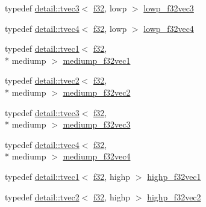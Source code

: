 \begin{DoxyCompactItemize}
\item 
typedef \hyperlink{structglm_1_1detail_1_1tvec3}{detail\-::tvec3}$<$ \hyperlink{group__gtc__type__precision_ga0ec999b57f5330d9021256e96038df04}{f32}, lowp $>$ \hyperlink{group__gtc__type__precision_ga1f878d91a5f5ab92c756244b62af7248}{lowp\-\_\-f32vec3}
\item 
typedef \hyperlink{structglm_1_1detail_1_1tvec4}{detail\-::tvec4}$<$ \hyperlink{group__gtc__type__precision_ga0ec999b57f5330d9021256e96038df04}{f32}, lowp $>$ \hyperlink{group__gtc__type__precision_ga59f7292d7ed0b7df72e6aa31010e2648}{lowp\-\_\-f32vec4}
\item 
typedef \hyperlink{structglm_1_1detail_1_1tvec1}{detail\-::tvec1}$<$ \hyperlink{group__gtc__type__precision_ga0ec999b57f5330d9021256e96038df04}{f32}, \\*
mediump $>$ \hyperlink{group__gtc__type__precision_gaf3d4077b241fbcab529fb0e0d88c0df6}{mediump\-\_\-f32vec1}
\item 
typedef \hyperlink{structglm_1_1detail_1_1tvec2}{detail\-::tvec2}$<$ \hyperlink{group__gtc__type__precision_ga0ec999b57f5330d9021256e96038df04}{f32}, \\*
mediump $>$ \hyperlink{group__gtc__type__precision_gaf53d380f948fdbb540eab960f2ad4b58}{mediump\-\_\-f32vec2}
\item 
typedef \hyperlink{structglm_1_1detail_1_1tvec3}{detail\-::tvec3}$<$ \hyperlink{group__gtc__type__precision_ga0ec999b57f5330d9021256e96038df04}{f32}, \\*
mediump $>$ \hyperlink{group__gtc__type__precision_gada8879dd10f28428e2eb1ae62f643f65}{mediump\-\_\-f32vec3}
\item 
typedef \hyperlink{structglm_1_1detail_1_1tvec4}{detail\-::tvec4}$<$ \hyperlink{group__gtc__type__precision_ga0ec999b57f5330d9021256e96038df04}{f32}, \\*
mediump $>$ \hyperlink{group__gtc__type__precision_gaa5a1b058d185d87504591a11c6247518}{mediump\-\_\-f32vec4}
\item 
typedef \hyperlink{structglm_1_1detail_1_1tvec1}{detail\-::tvec1}$<$ \hyperlink{group__gtc__type__precision_ga0ec999b57f5330d9021256e96038df04}{f32}, highp $>$ \hyperlink{group__gtc__type__precision_gac8be8ce31b9df0a5005d7c7458a3d03e}{highp\-\_\-f32vec1}
\item 
typedef \hyperlink{structglm_1_1detail_1_1tvec2}{detail\-::tvec2}$<$ \hyperlink{group__gtc__type__precision_ga0ec999b57f5330d9021256e96038df04}{f32}, highp $>$ \hyperlink{group__gtc__type__precision_gabba3e1b3ae0bcaa7aaac573c08c2f8d3}{highp\-\_\-f32vec2}

\end{DoxyCompactItemize}
